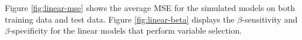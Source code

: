 \documentclass[final,onefignum,onetabnum]{siuro210301}
\begin{document}

	
	Figure \ref{fig:linear-mse} shows the average MSE for the simulated models on both training data and test data. Figure \ref{fig:linear-beta} displays the $\beta$-sensitivity and $\beta$-specificity for the linear models that perform variable selection.
	
\end{document}
